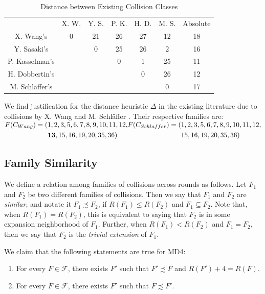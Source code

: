 \documentclass[conference]{IEEEtran}
\begin{document}
\begin{table}
    \caption{Distance between Existing Collision Classes}
    \label{table:distance}
    \begin{tabular}{c c c c c c c}
        & X. W. & Y. S. & P. K. & H. D. & M. S. & Absolute \\
        X. Wang's & 0 & 21 & 26 & 27 & 12 & 18 \\
        Y. Sasaki's & & 0 & 25 & 26 & 2 & 16 \\
        P. Kasselman's &  &  & 0 & 1 & 25 & 11 \\
        H. Dobbertin's &  &  &  & 0 & 26 & 12 \\
        M. Schl{\"a}ffer's &  &  &  &  & 0 & 17 \\
    \end{tabular}
\end{table}

We find justification for the distance heuristic $\Delta$ in the existing
literature due to collisions by  X. Wang \cite{cryptoeprint:2004:199} and
M. Schl{\"a}ffer \cite{Schlaffer2006}. Their respective families are:
$
\begin{aligned}
F(C_{Wang}) = (& 1, 2, 3, 5, 6, 7, 8, 9, 10, 11, 12, \\
        & \textbf{13}, 15, 16, 19, 20, 35, 36) \\
\end{aligned} \\
\begin{aligned}
F(C_{Schlaffer}) = (& 1, 2, 3, 5, 6, 7, 8, 9, 10, 11, 12, \\
         & 15, 16, 19, 20, 35, 36)
\end{aligned}
$



\subsection{Family Similarity}

We define a relation among families of collisions across rounds as follows.
Let $F_1$ and $F_2$ be two different families of collisions. Then we say that
$F_1$ and $F_2$ are \textit{similar}, and notate it $F_1 \precsim F_2$, if
$R(F_1) \leq R(F_2)$ and $F_1 \subseteq F_2$. Note that, when
$R(F_1) = R(F_2)$, this is equivalent to saying that $F_2$ is in some
expansion neighborhood of $F_1$. Further, when $R(F_1) < R(F_2)$ and
$F_1 = F_2$, then we say that $F_2$ is the \textit{trivial extension} of
$F_1$.

We claim that the following statements are true for MD4:
\begin{enumerate}
    \item For every $F \in \mathcal{F}$, there exists $F'$ such that
        $F' \precsim F$ and $R(F') + 4 = R(F)$.
    \item For every $F \in \mathcal{F}$, there exists $F'$ such that
        $F \precsim F'$.
\end{enumerate}
\end{document}
